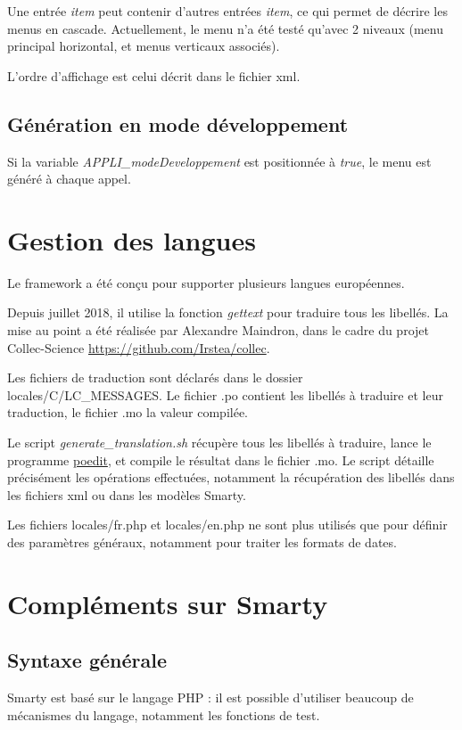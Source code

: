 Une entrée \textit{item} peut contenir d'autres entrées \textit{item}, ce qui permet de décrire les menus en cascade. Actuellement, le menu n'a été testé qu'avec 2 niveaux (menu principal horizontal, et menus verticaux associés).

L'ordre d'affichage est celui décrit dans le fichier xml.

\section{Génération en mode développement}

Si la variable \textit{APPLI\_modeDeveloppement} est positionnée à \textit{true}, le menu est généré à chaque appel.

\chapter{Gestion des langues}\label{langue}

Le framework a été conçu pour supporter plusieurs langues européennes.

Depuis juillet 2018, il utilise la fonction \textit{gettext} pour traduire tous les libellés. La mise au point a été réalisée par Alexandre Maindron, dans le cadre du projet Collec-Science \href{https://github.com/Irstea/collec}{https://github.com/Irstea/collec}.

Les fichiers de traduction sont déclarés dans le dossier locales/C/LC\_MESSAGES. Le fichier .po contient les libellés à traduire et leur traduction, le fichier .mo la valeur compilée.

Le script \textit{generate\_translation.sh} récupère tous les libellés à traduire, lance le programme \href{https://poedit.net/}{poedit}, et compile le résultat dans le fichier .mo. Le script détaille précisément les opérations effectuées, notamment la récupération des libellés dans les fichiers xml ou dans les modèles Smarty.

Les fichiers locales/fr.php et locales/en.php ne sont plus utilisés que pour définir des paramètres généraux, notamment pour traiter les formats de dates.

\chapter{Compléments sur Smarty}\label{smarty}

\section{Syntaxe générale}
Smarty est basé sur le langage PHP : il est possible d'utiliser beaucoup de mécanismes du langage, notamment les fonctions de test.

